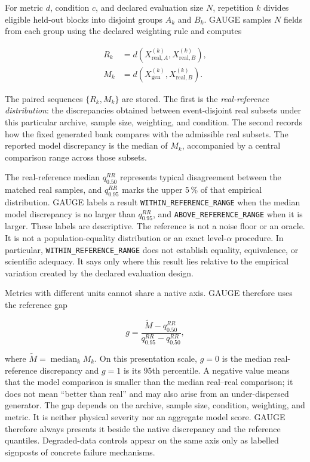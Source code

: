 \documentclass[gmd, manuscript]{copernicus}
\begin{document}
For metric \(d\), condition \(c\), and declared evaluation size \(N\), repetition
\(k\) divides eligible held-out blocks into disjoint groups \(A_k\) and \(B_k\).
GAUGE samples \(N\) fields from each group using the declared weighting rule and
computes

\begin{align}
R_k &= d(X^{(k)}_{\mathrm{real},A},X^{(k)}_{\mathrm{real},B}),\\
M_k &= d(X^{(k)}_{\mathrm{gen}},X^{(k)}_{\mathrm{real},B}).
\label{eq:reference}
\end{align}

The paired sequences \(\{R_k,M_k\}\) are stored. The first is the
\emph{real-reference distribution}: the discrepancies obtained between event-disjoint
real subsets under this particular archive, sample size, weighting, and condition.
The second records how the fixed generated bank compares with the admissible real
subsets. The reported model discrepancy is the median of \(M_k\), accompanied by a
central comparison range across those subsets.

The real-reference median \(q_{0.50}^{RR}\) represents typical disagreement between
the matched real samples, and \(q_{0.95}^{RR}\) marks the upper 5\,\% of that empirical
distribution. GAUGE labels a result \texttt{WITHIN\_REFERENCE\_RANGE} when the median
model discrepancy is no larger than \(q_{0.95}^{RR}\), and
\texttt{ABOVE\_REFERENCE\_RANGE} when it is larger. These labels are descriptive.
The reference is not a noise floor or an oracle. It is not a population-equality
distribution or an exact level-\(\alpha\) procedure. In particular,
\texttt{WITHIN\_REFERENCE\_RANGE} does not establish equality, equivalence, or
scientific adequacy. It says only where this result lies relative to the empirical
variation created by the declared evaluation design.

Metrics with different units cannot share a native axis. GAUGE therefore uses the
reference gap

\begin{equation}
g =
\frac{\widetilde{M}-q_{0.50}^{RR}}
{q_{0.95}^{RR}-q_{0.50}^{RR}},
\label{eq:gap}
\end{equation}

where \(\widetilde{M}=\operatorname{median}_k M_k\). On this presentation scale,
\(g=0\) is the median real-reference discrepancy and \(g=1\) is its 95th percentile.
A negative value means that the model comparison is smaller than the median
real--real comparison; it does not mean ``better than real'' and may also arise from
an under-dispersed generator. The gap depends on the archive, sample size, condition,
weighting, and metric. It is neither physical severity nor an aggregate model score.
GAUGE therefore always presents it beside the native discrepancy and the reference
quantiles. Degraded-data controls appear on the same axis only as labelled signposts
of concrete failure mechanisms.
\end{document}
